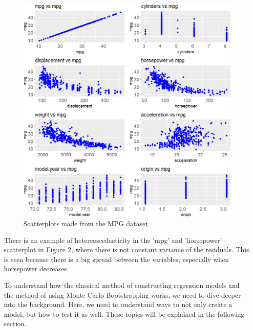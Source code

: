 \begin{figure}[h]
	\includegraphics[width=\linewidth]{billder/2.png}
	\caption{Scatterplots made from the MPG dataset}
	\label{fig:2}
\end{figure}
There is an example of hetereoscedasticity in the 'mpg' and 'horsepower' scatterplot in Figure 2, where there is not constant variance of the residuals. This is seen because there is a big spread between the variables, especially when horsepower decreases.   

\noindent To understand how the classical method of constructing regression models and the method of using Monte Carlo Bootstrapping works, we need to dive deeper into the background. Here, we need to understand ways to not only create a model, but how to test it as well. These topics will be explained in the following section.


